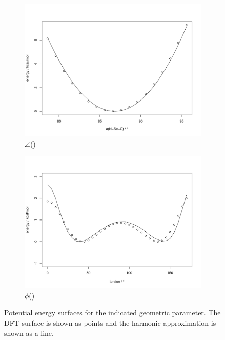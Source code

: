 \begin{refsection}
\begin{figure}
\begin{subfigure}{0.4\linewidth}
        \includegraphics[width=\linewidth]{Figures/ch2-sifig/NSeC.pdf}
        \caption{$ \angle $()}
    \end{subfigure}
    \begin{subfigure}{0.4\linewidth}
        \includegraphics[width=\linewidth]{Figures/ch2-sifig/SeNCC.pdf}
        \caption{$ \phi $()}
    \end{subfigure}
    \caption[Potential energy surfaces of ebselen.]{Potential energy surfaces for the indicated geometric parameter. The DFT surface is shown as points and the harmonic approximation is shown as a line.}\label{fig:pes}
\end{figure}


\end{refsection}

